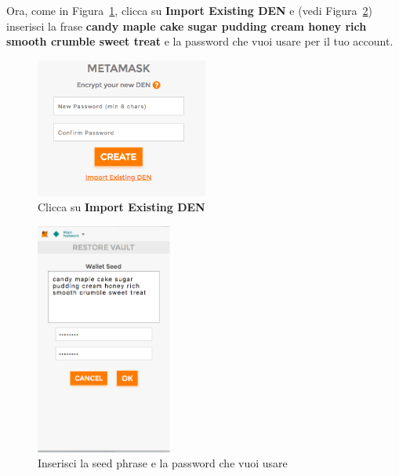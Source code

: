 Ora, come in Figura~\ref{fig:metamask2}, clicca su \textbf{Import Existing DEN} e (vedi Figura~\ref{fig:metamask3}) inserisci la frase \textbf{candy maple cake sugar pudding cream honey rich smooth crumble sweet treat} e la password che vuoi usare per il tuo account.


\begin{figure}[h]
\centering
\includegraphics[height=1.8in]{./img/importa.png}
\caption{Clicca su \textbf{Import Existing DEN}}
\label{fig:metamask2}
\end{figure}

\begin{figure}[h]
\centering
\includegraphics[height=3in]{./img/stringa_psw.png}
\caption{Inserisci la seed phrase e la password che vuoi usare}
\label{fig:metamask3}
\end{figure}



\clearpage